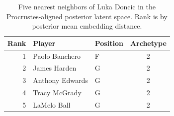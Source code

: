 \begin{table}[htbp]
  \centering\small
  \begin{tabular}{rllc}
    \toprule
    Rank & Player & Position & Archetype \\
    \midrule
    1 & Paolo Banchero & F & 2 \\
    2 & James Harden & G & 2 \\
    3 & Anthony Edwards & G & 2 \\
    4 & Tracy McGrady & G & 2 \\
    5 & LaMelo Ball & G & 2 \\
    \bottomrule
  \end{tabular}
  \caption{Five nearest neighbors of Luka Doncic in the Procrustes-aligned posterior latent space. Rank is by posterior mean embedding distance.}
  \label{tab:Luka_Doncic_neighbors}
\end{table}


